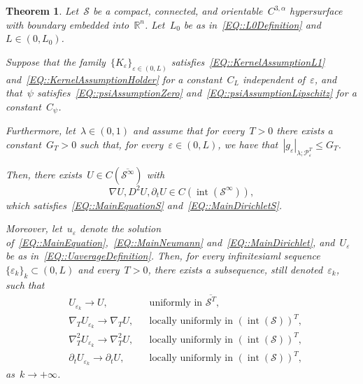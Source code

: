 \documentclass[12pt,a4paper]{amsart}
\numberwithin{equation}{section}
\newtheorem{theorem}{Theorem}[section]
\theoremstyle{definition}
\theoremstyle{remark}
\newcommand{\R}{\mathbb{R}}
\newcommand{\eps}{\varepsilon}
\newcommand{\abs}[1]{\left\lvert#1\right\rvert}
\renewcommand{\leq}{\leqslant}
\begin{document}
\begin{theorem}\label{THM::thm1}
    Let~$\mathcal{S}$ be a compact, connected, and orientable~$C^{3,\alpha}$ hypersurface with boundary embedded into~$\R^n$. Let~$L_0$ be as in~\eqref{EQ::L0Definition} and~$L \in (0,L_0)$.
    
    Suppose that the family~${\{K_\eps\}}_{\eps \in (0,L)}$ satisfies~\eqref{EQ::KernelAssumptionL1} and~\eqref{EQ::KernelAssumptionHolder} for a constant~$C_L$ independent of~$\eps$, and that~$\psi$ satisfies~\eqref{EQ::psiAssumptionZero} and~\eqref{EQ::psiAssumptionLipschitz} for a constant~$C_\psi$.
    
    Furthermore, let~$\lambda \in (0,1)$ and assume that for every~$T>0$ there exists a constant~$G_T > 0$ such that, for every~$\eps \in (0,L)$, we have that~$\abs{g_\eps}_{\lambda; \mathcal{P}_\eps^T} \leq G_T$.
    
    Then, there exists~$U \in C\left(\overline{\mathcal{S}^\infty}\right)$ with
    \begin{equation}\label{EQ::UisCstar}
        \nabla U,D^2 U, \partial_t U \in C\left(\operatorname{int}(\mathcal{S}^\infty)\right),
    \end{equation} 
    which satisfies~\eqref{EQ::MainEquationS} and~\eqref{EQ::MainDirichletS}.

    Moreover, let~$u_\eps$ denote the solution of~\eqref{EQ::MainEquation},~\eqref{EQ::MainNeumann} and~\eqref{EQ::MainDirichlet}, and~$U_\eps$ be as in~\eqref{EQ::UaverageDefinition}. Then, for every infinitesiaml sequence~${\{\eps_k\}}_k \subset (0,L)$ and every~$T > 0$, there exists a subsequence, still denoted~$\eps_k$, such that
    \begin{equation}\label{EQ::UkConvergesToU}
        \begin{aligned}
            &U_{\eps_k} \to U,&&\text{uniformly in }\overline{\mathcal{S}^T},\\
            &\nabla_T U_{\eps_k} \to \nabla_T U,&&\text{locally uniformly in }{\left(\operatorname{int}(\mathcal{S})\right)}^T,\\
            &\nabla_T^2 U_{\eps_k} \to \nabla_T^2 U,&&\text{locally uniformly in }{\left(\operatorname{int}(\mathcal{S})\right)}^T,\\
            &\partial_t U_{\eps_k} \to \partial_t U,&&\text{locally uniformly in }{\left(\operatorname{int}(\mathcal{S})\right)}^T,
        \end{aligned}
    \end{equation}
    as~$k \to +\infty$.
\end{theorem}
\end{document}
